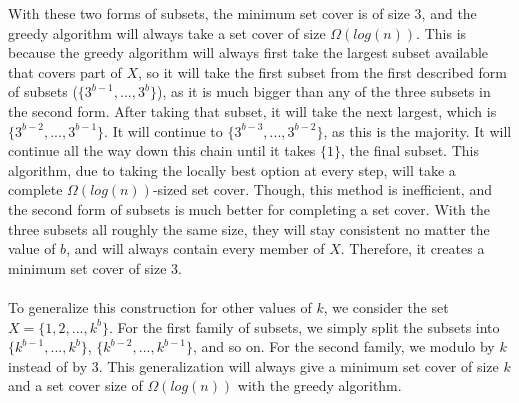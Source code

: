 \documentclass[11pt]{article}
\begin{document}
\begin{enumerate}
With these two forms of subsets, the minimum set cover is of size 3, and the greedy algorithm will always take a set cover of size $\Omega(log(n))$. This is because the greedy algorithm will always first take the largest subset available that covers part of $X$, so it will take the first subset from the first described form of subsets ($\{3^{b-1}, ..., 3^b\}$), as it is much bigger than any of the three subsets in the second form. After taking that subset, it will take the next largest, which is $\{3^{b-2}, ..., 3^{b-1}\}$. It will continue to $\{3^{b-3}, ..., 3^{b-2}\}$, as this is the majority. It will continue all the way down this chain until it takes $\{1\}$, the final subset. This algorithm, due to taking the locally best option at every step, will take a complete $\Omega(log(n))$-sized set cover. Though, this method is inefficient, and the second form of subsets is much better for completing a set cover. With the three subsets all roughly the same size, they will stay consistent no matter the value of $b$, and will always contain every member of $X$. Therefore, it creates a minimum set cover of size 3. \\
\\
To generalize this construction for other values of $k$, we consider the set $X = \{1,2,...,k^b\}$. For the first family of subsets, we simply split the subsets into $\{k^{b-1}, ..., k^b\}$, $\{k^{b-2}, ..., k^{b-1}\}$, and so on. For the second family, we modulo by $k$ instead of by $3$. This generalization will always give a minimum set cover of size $k$ and a set cover size of $\Omega(log(n))$ with the greedy algorithm. 


\end{enumerate}
\end{document}

